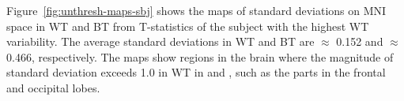 \documentclass[conference]{IEEEtran}
\begin{document}

  Figure~\ref{fig:unthresh-maps-sbj} shows the maps of standard deviations on MNI space in WT and BT from T-statistics of
  the subject with the highest WT variability.
  The average standard deviations in WT and BT are $\approx$ 0.152 and $\approx$ 0.466, respectively.
  The maps show regions in the brain where the magnitude of standard deviation exceeds 1.0 in WT in \fslafni and \afnispm,
  such as the parts in the frontal and occipital lobes.


\begin{figure}[b]
\end{figure}
\end{document}
